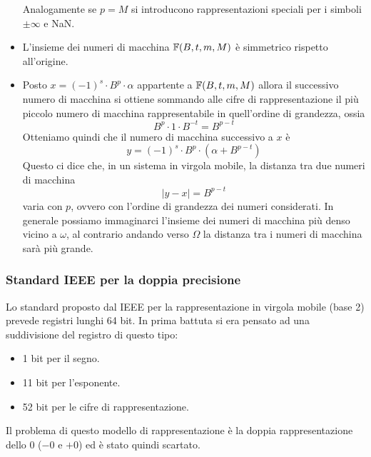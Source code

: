 \begin{observation}
\begin{itemize}
		      Analogamente se $p = M$ si introducono rappresentazioni speciali per i simboli $\pm \infty$
		      e NaN.
		\item L'insieme dei numeri di macchina $\mathbb{F} (B, t, m, M)$ è simmetrico rispetto all'origine.
		\item Posto $x = (-1)^s \cdot B^p \cdot \alpha$ appartente a $\mathbb{F}(B, t, m, M)$ allora il
		      successivo numero di macchina si ottiene sommando alle cifre di rappresentazione il più piccolo
		      numero di macchina rappresentabile in quell'ordine di grandezza, ossia
		      \[ B^p \cdot 1 \cdot B^{-t} = B^{p - t} \]
		      Otteniamo quindi che il numero di macchina successivo a $x$ è
		      \[ y = (-1)^s \cdot B^p \cdot (\alpha + B^{p-t}) \]
		      Questo ci dice che, in un sistema in virgola mobile, la distanza tra due numeri di macchina
		      \[ |y - x| = B^{p-t} \]
		      varia con $p$, ovvero con l'ordine di grandezza dei numeri considerati. In generale possiamo
		      immaginarci l'insieme dei numeri di macchina più denso vicino a $\omega$, al contrario andando
		      verso $\Omega$ la distanza tra i numeri di macchina sarà più grande.
	\end{itemize}
\end{observation}

\subsubsection{Standard IEEE per la doppia precisione}
Lo standard proposto dal IEEE per la rappresentazione in virgola mobile (base 2) prevede registri lunghi 64 bit.
In prima battuta si era pensato ad una suddivisione del registro di questo tipo:
\begin{itemize}
	\item 1 bit per il segno.
	\item 11 bit per l'esponente.
	\item 52 bit per le cifre di rappresentazione.
\end{itemize}
Il problema di questo modello di rappresentazione è la doppia rappresentazione dello 0 ($-0$ e $+0$) ed è stato
quindi scartato.

